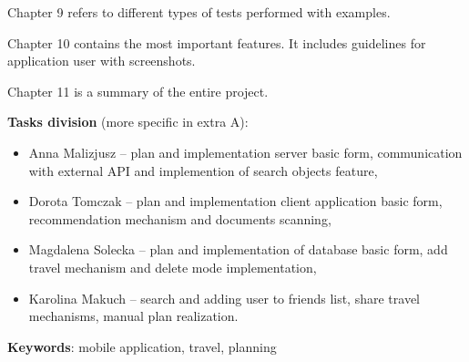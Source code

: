 \par Chapter 9 refers to different types of tests performed with examples.

\par Chapter 10 contains the most important features. It includes guidelines for 
application user with screenshots.

\par Chapter 11 is a summary of the entire project.

\par \textbf{Tasks division} (more specific in extra A):
\begin{itemize}
\item Anna Malizjusz -- plan and implementation server basic form, communication with 
external API and implemention of search objects feature,
\item Dorota Tomczak -- plan and implementation client application basic form, 
recommendation mechanism and documents scanning,
\item Magdalena Solecka -- plan and implementation of database basic form, add travel 
mechanism and delete mode implementation,
\item Karolina Makuch -- search and adding user to friends list, share travel 
mechanisms, manual plan realization.
\end{itemize}
\textbf{Keywords}: mobile application, travel, planning